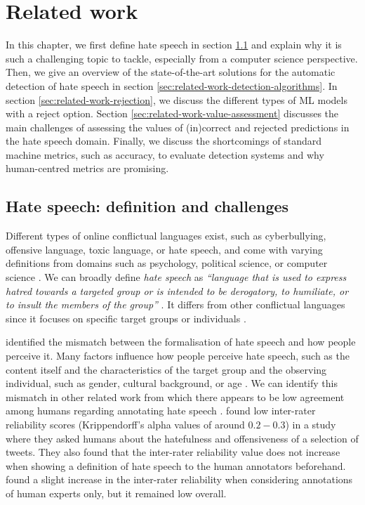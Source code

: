 \chapter{Related work}
In this chapter, we first define hate speech in section \ref{sec:related-work-challenges} and explain why it is such a challenging topic to tackle, especially from a computer science perspective.
%
Then, we give an overview of the state-of-the-art solutions for the automatic detection of hate speech in section \ref{sec:related-work-detection-algorithms}.
%
In section \ref{sec:related-work-rejection}, we discuss the different types of ML models with a reject option.
%
Section \ref{sec:related-work-value-assessment} discusses the main challenges of assessing the values of (in)correct and rejected predictions in the hate speech domain.
%
Finally, we discuss the shortcomings of standard machine metrics, such as accuracy, to evaluate detection systems and why human-centred metrics are promising.

\section{Hate speech: definition and challenges}
\label{sec:related-work-challenges}
Different types of online conflictual languages exist, such as cyberbullying, offensive language, toxic language, or hate speech, and come with varying definitions from domains such as psychology, political science, or computer science \citep{balayn2021automatic}.
%
We can broadly define \textit{hate speech} as \emph{``language that is used to express hatred towards a targeted group or is intended to be derogatory, to humiliate, or to insult the members of the group''} \citep{davidson2017automated, balayn2021automatic}.
%
It differs from other conflictual languages since it focuses on specific target groups or individuals \citep{balayn2021automatic}.
%
%

%
\citet{balayn2021automatic} identified the mismatch between the formalisation of hate speech and how people perceive it.
%
Many factors influence how people perceive hate speech, such as the content itself and the characteristics of the target group and the observing individual, such as gender, cultural background, or age \citep{balayn2021automatic}.
%
We can identify this mismatch in other related work from which there appears to be low agreement among humans regarding annotating hate speech \citep{fortuna2018survey, ross2017measuring, waseem2016you}.
%
\citet{ross2017measuring} found low inter-rater reliability scores (Krippendorff's alpha values of around $0.2-0.3$) in a study where they asked humans about the hatefulness and offensiveness of a selection of tweets.
%
They also found that the inter-rater reliability value does not increase when showing a definition of hate speech to the human annotators beforehand.
%
\citet{waseem2016you} found a slight increase in the inter-rater reliability when considering annotations of human experts only, but it remained low overall.
%
%

